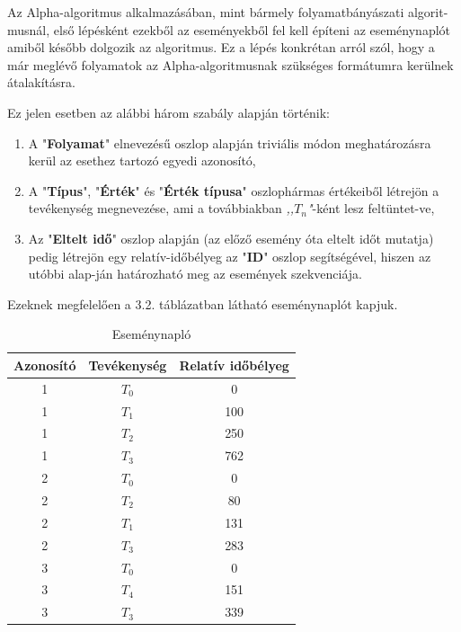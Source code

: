 \begin{example}
	Az Alpha-algoritmus alkalmazásában, mint bármely folyamatbányászati algorit\hyp{}musnál, első lépésként ezekből az eseményekből fel kell építeni az eseménynaplót amiből később dolgozik az algoritmus. Ez a lépés konkrétan arról szól, hogy a már meglévő folyamatok az Alpha-algoritmusnak szükséges formátumra kerülnek átalakításra.
	
	Ez jelen esetben az alábbi három szabály alapján történik:
	\begin{enumerate}
		\item A "\textbf{Folyamat}" elnevezésű oszlop alapján triviális módon meghatározásra kerül az esethez tartozó egyedi azonosító,
		\item A "\textbf{Típus}", "\textbf{Érték}" és "\textbf{Érték típusa}" oszlophármas értékeiből létrejön a tevékenység megnevezése,  ami a továbbiakban \textit{,,$T_{n}$"}-ként lesz feltüntet\hyp{}ve,
		\item Az "\textbf{Eltelt idő}" oszlop alapján (az előző esemény óta eltelt időt mutatja) pedig létrejön egy relatív-időbélyeg az "\textbf{ID}" oszlop segítségével, hiszen az utóbbi alap\hyp{}ján határozható meg az események szekvenciája.
	\end{enumerate}
	
	Ezeknek megfelelően a 3.2. táblázatban látható eseménynaplót kapjuk.
	\newpage

	\begin{table}[h]
	\begin{center}
	\caption{Eseménynapló}
	\begin{tabular}{|| c | c | c ||}
		\hline
		Azonosító & Tevékenység & Relatív időbélyeg \\ [0.5ex]
		\hline\hline
		1 & $T_0$ & 0 \\
		\hline
		1 & $T_1$ & 100 \\
		\hline
		1 & $T_2$ & 250 \\
		\hline
		1 & $T_3$ & 762 \\
		\hline
		2 & $T_0$ & 0 \\
		\hline
		2 & $T_2$ & 80 \\
		\hline
		2 & $T_1$ & 131 \\
		\hline
		2 & $T_3$ & 283 \\
		\hline
		3 & $T_0$ & 0 \\
		\hline
		3 & $T_4$ & 151 \\
		\hline
		3 & $T_3$ & 339 \\
		\hline
	\end{tabular}
	\label{fig:planexample}
	\end{center}
	\end{table}	
	

\end{example}
